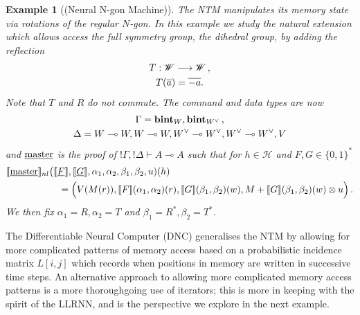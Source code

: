 \documentclass[english,letter paper,12pt,leqno]{article}
\theoremstyle{example}
\newtheorem{example}[theorem]{Example}
\numberwithin{equation}{section}
\begin{document}
\begin{example}[(Neural N-gon Machine)] The NTM manipulates its memory state via rotations of the regular $N$-gon. In this example we study the natural extension which allows access the full symmetry group, the dihedral group, by adding the reflection
\begin{gather*}
T: \mathscr{W} \longrightarrow \mathscr{W}\,,\\
T(\overline{a}) = \overline{-a}.
\end{gather*}
Note that $T$ and $R$ do not commute. The command and data types are now
\begin{gather*}
\Gamma = \textbf{bint}_W, \textbf{bint}_{W^{\vee}}\,,\\
\Delta = W \multimap W, W \multimap W, W^{\vee} \multimap W^{\vee}, W^{\vee} \multimap W^{\vee}, V
\end{gather*}
and $\underline{\textup{master}}$ is the proof of ${!} \Gamma, {!} \Delta \vdash A \multimap A$ such that for $h \in \mathscr{H}$ and $F,G \in \{0,1\}^*$
\begin{align*}
\llbracket \underline{\textup{master}} \rrbracket_{nl}&\big( \llbracket \underline{F} \rrbracket, \llbracket \underline{G} \rrbracket, \alpha_1, \alpha_2, \beta_1, \beta_2, u )(h)\\
&\quad = \Big(V(M(r)), \llbracket F \rrbracket(\alpha_1,\alpha_2)(r),\llbracket G \rrbracket(\beta_1,\beta_2)(w), M + \llbracket G \rrbracket(\beta_1,\beta_2)(w) \otimes u\Big)\,.
\end{align*}
We then fix $\alpha_1 = R, \alpha_2 = T$ and $\beta_1 = R^*, \beta_2 = T^*$.
\end{example}

The Differentiable Neural Computer (DNC) \cite{dnc} generalises the NTM by allowing for more complicated patterns of memory access based on a probabilistic incidence matrix $L[i,j]$ which records when positions in memory are written in successive time steps. An alternative approach to allowing more complicated memory access patterns is a more thoroughgoing use of iterators; this is more in keeping with the spirit of the LLRNN, and is the perspective we explore in the next example.
\end{document}
